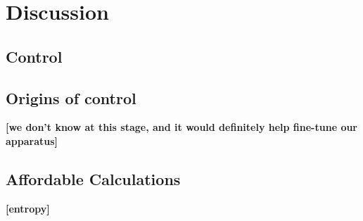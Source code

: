 \section{Discussion}


\subsection{Control}


\subsection{Origins of control}

{\bf [we don't know at this stage, and it would definitely help fine-tune our apparatus]}

\subsection{Affordable Calculations}


{\bf [entropy]}
